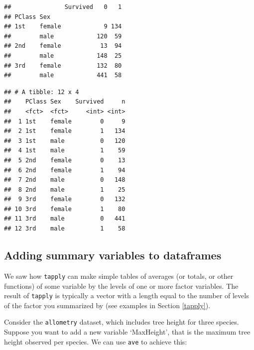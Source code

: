 \documentclass[]{book}
\newenvironment{Shaded}{\begin{snugshade}}{\end{snugshade}}
\newcommand{\CommentTok}[1]{\textcolor[rgb]{0.56,0.35,0.01}{\textit{#1}}}
\newcommand{\DataTypeTok}[1]{\textcolor[rgb]{0.13,0.29,0.53}{#1}}
\newcommand{\KeywordTok}[1]{\textcolor[rgb]{0.13,0.29,0.53}{\textbf{#1}}}
\newcommand{\NormalTok}[1]{#1}
\newcommand{\OperatorTok}[1]{\textcolor[rgb]{0.81,0.36,0.00}{\textbf{#1}}}
\newcommand{\StringTok}[1]{\textcolor[rgb]{0.31,0.60,0.02}{#1}}
\begin{document}
\begin{verbatim}
##               Survived   0   1
## PClass Sex                    
## 1st    female            9 134
##        male            120  59
## 2nd    female           13  94
##        male            148  25
## 3rd    female          132  80
##        male            441  58
\end{verbatim}

\begin{Shaded}
\end{Shaded}

\begin{verbatim}
## # A tibble: 12 x 4
##    PClass Sex    Survived     n
##    <fct>  <fct>     <int> <int>
##  1 1st    female        0     9
##  2 1st    female        1   134
##  3 1st    male          0   120
##  4 1st    male          1    59
##  5 2nd    female        0    13
##  6 2nd    female        1    94
##  7 2nd    male          0   148
##  8 2nd    male          1    25
##  9 3rd    female        0   132
## 10 3rd    female        1    80
## 11 3rd    male          0   441
## 12 3rd    male          1    58
\end{verbatim}

\hypertarget{summaryvars}{%
\subsection{Adding summary variables to dataframes}\label{summaryvars}}

We saw how \texttt{tapply} can make simple tables of averages (or totals, or other functions) of some variable by the levels of one or more factor variables. The result of \texttt{tapply} is typically a vector with a length equal to the number of levels of the factor you summarized by (see examples in Section \ref{tapply}).

Consider the \texttt{allometry} dataset, which includes tree height for three species. Suppose you want to add a new variable `MaxHeight', that is the maximum tree height observed per species. We can use \texttt{ave} to achieve this:

\begin{Shaded}
\end{Shaded}
\end{document}

